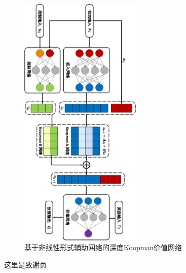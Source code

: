 \documentclass[AutoFakeBold]{LZUThesis}
\begin{document}
\begin{figure}[htbp]
  \centering
  \includegraphics[width=0.52\textwidth]{figures/dkn-rotate.pdf}
  \caption{基于非线性形式辅助网络的深度Koopman价值网络}
  \label{DKN_critic}
\end{figure}

\Thanks

这里是致谢页

\Grade %
\end{document}
